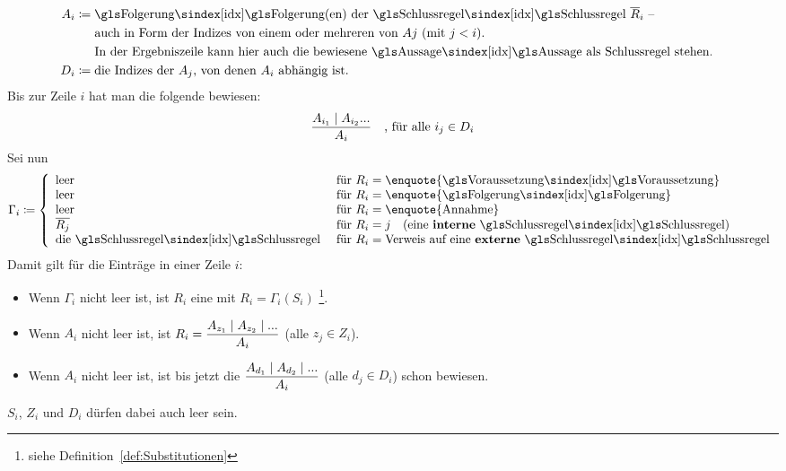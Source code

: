 {\begin{align}
	\\
	A_i & \defeq \text{\glsIdx{Folgerung}(en) der \glsIdx{Schlussregel} $\overline{R}_i$ --}\\
	& \quad\;\; \text{auch in Form der Indizes von einem oder mehreren von $Aj$ (mit $j < i$).}\\
	& \quad\;\; \text{In der Ergebniszeile kann hier auch die bewiesene \Aussage\ als Schlussregel stehen.}
	\\
	D_i & \defeq \text{die Indizes der $A_j$, von denen $A_i$ abhängig ist.}
\end{align}
Bis zur Zeile $i$ hat man die folgende  bewiesen:
\[ \frac{A_{i_1} \mid A_{i_2} ...}{A_i} \quad \text{, für alle } i_j \in D_i \]
Sei nun
\[
	\Gamma_i \defeq
	\left\{
		\begin{array}{ll}
			\text{leer}    & \text{ für } R_i = \text{\enquote{\glsIdx{Voraussetzung}}} \\
			\text{leer}    & \text{ für } R_i = \text{\enquote{\glsIdx{Folgerung}}}     \\
			\text{leer}    & \text{ für } R_i = \text{\enquote{Annahme}}       \\
			\overline{R_j} & \text{ für } R_i = j \quad \text{(eine \defn{interne} \glsIdx{Schlussregel})} \\
			\text{die \glsIdx{Schlussregel}} & \text{ für } R_i = \text{Verweis auf eine \defn{externe} \glsIdx{Schlussregel}}
		\end{array}
	\right.
\]
Damit gilt für die Einträge in einer Zeile $i$:
\begin{itemize}
	\item Wenn $\Gamma_i$ nicht leer ist, ist $R_i$ eine  mit $R_i = \Gamma_i(S_i)$%
	\footnote{%
		siehe Definition~\eqref{def:Substitutionen} 
	}.
	\item Wenn $A_i$ nicht leer ist, ist $R_i = \dfrac{A_{z_1} \mid A_{z_2} \mid ...}{A_i}$ (alle $z_j \in Z_i$).
	\item Wenn $A_i$ nicht leer ist, ist bis jetzt die  $\dfrac{A_{d_1} \mid A_{d_2} \mid ...}{A_i}$ (alle $d_j \in D_i$) schon bewiesen.
\end{itemize}
$S_i$, $Z_i$ und $D_i$ dürfen dabei auch leer sein.

}

